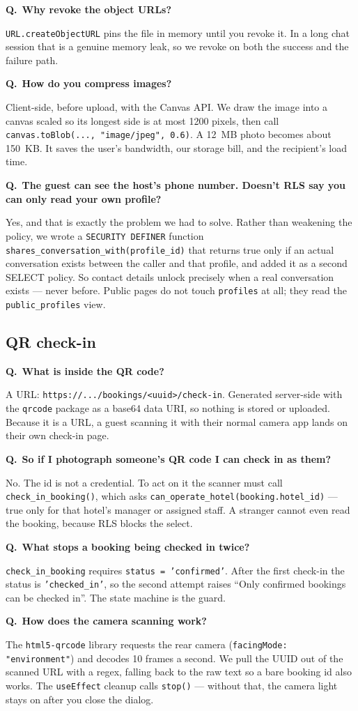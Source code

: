 \documentclass[11pt,a4paper]{article}
\newcommand{\Q}[1]{\vspace{7pt}\noindent\textbf{\color{primary}Q.}~\textbf{#1}\par\vspace{1pt}}
\newcommand{\A}[1]{\noindent #1\par}
\begin{document}
\Q{Why revoke the object URLs?}
\A{\texttt{URL.createObjectURL} pins the file in memory until you revoke it. In a
long chat session that is a genuine memory leak, so we revoke on both the success
and the failure path.}

\Q{How do you compress images?}
\A{Client-side, before upload, with the Canvas API. We draw the image into a canvas
scaled so its longest side is at most 1200 pixels, then call
\texttt{canvas.toBlob(..., "image/jpeg", 0.6)}. A 12~MB photo becomes about
150~KB. It saves the user's bandwidth, our storage bill, and the recipient's load
time.}

\Q{The guest can see the host's phone number. Doesn't RLS say you can only read
your own profile?}
\A{Yes, and that is exactly the problem we had to solve. Rather than weakening the
policy, we wrote a \texttt{SECURITY DEFINER} function
\texttt{shares\_conversation\_with(profile\_id)} that returns true only if an
actual conversation exists between the caller and that profile, and added it as a
second SELECT policy. So contact details unlock precisely when a real conversation
exists --- never before. Public pages do not touch \texttt{profiles} at all; they
read the \texttt{public\_profiles} view.}

\subsection{QR check-in}

\Q{What is inside the QR code?}
\A{A URL: \texttt{https://.../bookings/<uuid>/check-in}. Generated server-side with
the \texttt{qrcode} package as a base64 data URI, so nothing is stored or uploaded.
Because it is a URL, a guest scanning it with their normal camera app lands on
their own check-in page.}

\Q{So if I photograph someone's QR code I can check in as them?}
\A{No. The id is not a credential. To act on it the scanner must call
\texttt{check\_in\_booking()}, which asks
\texttt{can\_operate\_hotel(booking.hotel\_id)} --- true only for that hotel's
manager or assigned staff. A stranger cannot even read the booking, because RLS
blocks the select.}

\Q{What stops a booking being checked in twice?}
\A{\texttt{check\_in\_booking} requires \texttt{status = 'confirmed'}. After the
first check-in the status is \texttt{'checked\_in'}, so the second attempt raises
``Only confirmed bookings can be checked in''. The state machine is the guard.}

\Q{How does the camera scanning work?}
\A{The \texttt{html5-qrcode} library requests the rear camera
(\texttt{facingMode: "environment"}) and decodes 10 frames a second. We pull the
UUID out of the scanned URL with a regex, falling back to the raw text so a bare
booking id also works. The \texttt{useEffect} cleanup calls \texttt{stop()} ---
without that, the camera light stays on after you close the dialog.}
\end{document}
